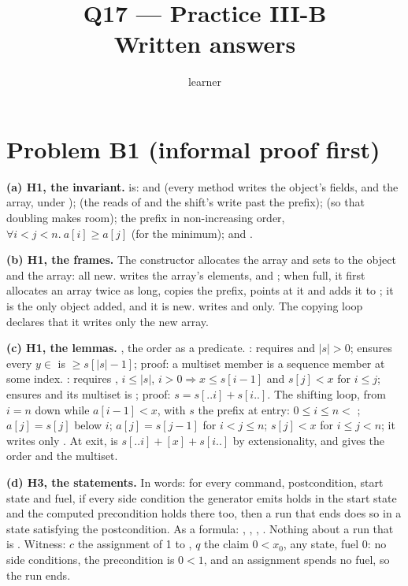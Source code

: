 \documentclass[11pt]{article}
\title{Q17 --- Practice III-B \\ \large Written answers}
\author{learner}
\date{}
\begin{document}
\maketitle
\sloppy

\section*{Problem B1 (informal proof first)}\label{ans:B1}
\begin{answer}
\textbf{(a) H1, the invariant.}  is:  and
 (every method writes the object's fields, and  the
array, under );  (the reads of
 and the shift's write past the prefix);  (so
that doubling makes room); the prefix in non-increasing order,
$\forall i < j < n.\ a[i] \ge a[j]$ (for the minimum); and
.

\textbf{(b) H1, the frames.} The constructor allocates the array and sets
 to the object and the array: all new.  writes the array's
elements,  and ; when full, it first allocates an array twice
as long, copies the prefix, points  at it and adds it to ; it
is the only object added, and it is new.  writes  and
 only. The copying loop declares that it writes only the new array.

\textbf{(c) H1, the lemmas.} , the order as a predicate.
: requires  and $|s| > 0$; ensures every
$y \in$  is $\ge s[|s| - 1]$; proof: a multiset member is a
sequence member at some index. : requires
, $i \le |s|$, $i > 0 \Rightarrow x \le s[i - 1]$ and
$s[j] < x$ for $i \le j$; ensures  and its
multiset is ; proof: $s = s[..i] + s[i..]$.
The shifting loop, from $i = n$ down while $a[i - 1] < x$, with $s$ the prefix
at entry: $0 \le i \le n <$ ; $a[j] = s[j]$ below $i$;
$a[j] = s[j - 1]$ for $i < j \le n$; $s[j] < x$ for $i \le j < n$; it writes
only . At exit,  is $s[..i] + [x] + s[i..]$ by
extensionality, and  gives the order and the multiset.

\textbf{(d) H3, the statements.} In words: for every command, postcondition,
start state and fuel, if every side condition the generator emits holds in the
start state and the computed precondition holds there too, then a run that ends
does so in a state satisfying the postcondition. As a formula:
,
,
,
.
Nothing about a run that is . Witness: $c$ the assignment of 1 to
, $q$ the claim $0 < x_0$, any state, fuel 0: no side conditions, the
precondition is $0 < 1$, and an assignment spends no fuel, so the run ends.


\end{answer}
\end{document}
